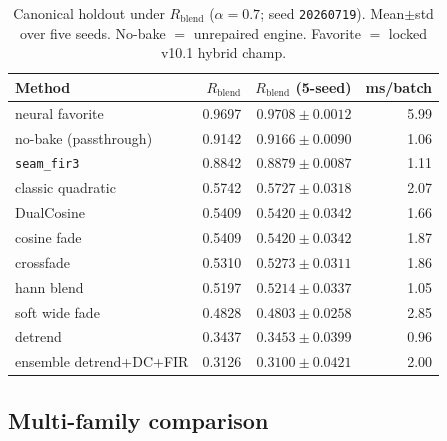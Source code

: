 \begin{table}[t]
  \centering
  \caption{Canonical holdout under $R_{\mathrm{blend}}$ ($\alpha{=}0.7$; seed \texttt{20260719}). Mean$\pm$std over five seeds. No-bake $=$ unrepaired engine. Favorite $=$ locked v10.1 hybrid champ.}
  \label{tab:canonical-methods}
  \setlength{\tabcolsep}{3pt}
  \begin{tabular}{@{}lrrr@{}}
    \toprule
    Method & $R_{\mathrm{blend}}$ & $R_{\mathrm{blend}}$ (5-seed) & ms/batch \\
    \midrule
    neural favorite & 0.9697 & $0.9708\pm0.0012$ & 5.99 \\
    no-bake (passthrough) & 0.9142 & $0.9166\pm0.0090$ & 1.06 \\
    \texttt{seam\_fir3} & 0.8842 & $0.8879\pm0.0087$ & 1.11 \\
    classic quadratic & 0.5742 & $0.5727\pm0.0318$ & 2.07 \\
    DualCosine & 0.5409 & $0.5420\pm0.0342$ & 1.66 \\
    cosine fade & 0.5409 & $0.5420\pm0.0342$ & 1.87 \\
    crossfade & 0.5310 & $0.5273\pm0.0311$ & 1.86 \\
    hann blend & 0.5197 & $0.5214\pm0.0337$ & 1.05 \\
    soft wide fade & 0.4828 & $0.4803\pm0.0258$ & 2.85 \\
    detrend & 0.3437 & $0.3453\pm0.0399$ & 0.96 \\
    ensemble detrend{+}DC{+}FIR & 0.3126 & $0.3100\pm0.0421$ & 2.00 \\
    \bottomrule
  \end{tabular}
\end{table}

\subsection{Multi-family comparison}
\label{sec:sota-main}

